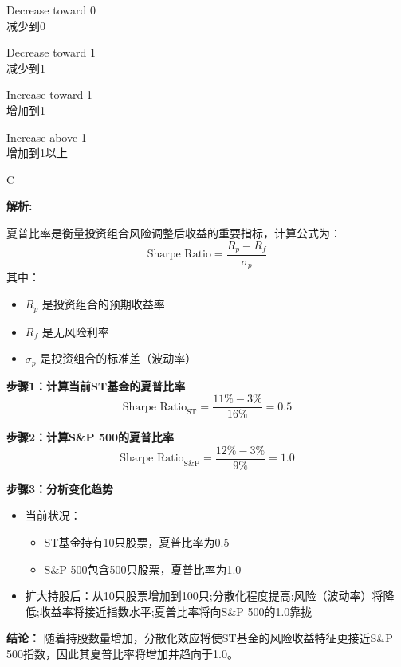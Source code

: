 \documentclass{article}
\newenvironment{explanation}
{\textbf{解析:}\par}
{\par}
\begin{document}
\begin{choices}
    \item Decrease toward 0
    \\
    减少到0
    \item Decrease toward 1
    \\
    减少到1
    \item Increase toward 1
    \\
    增加到1
    \item Increase above 1
    \\
    增加到1以上
\end{choices}

\begin{correctanswer}
    C
\end{correctanswer}

\begin{explanation}
    夏普比率是衡量投资组合风险调整后收益的重要指标，计算公式为：
    \[
    \text{Sharpe Ratio} = \frac{R_p - R_f}{\sigma_p}
    \]
    其中：
    \begin{itemize}
        \item $R_p$ 是投资组合的预期收益率
        \item $R_f$ 是无风险利率
        \item $\sigma_p$ 是投资组合的标准差（波动率）
    \end{itemize}


    \textbf{步骤1：计算当前ST基金的夏普比率}
    \[
    \text{Sharpe Ratio}_{\text{ST}} = \frac{11\% - 3\%}{16\%} = 0.5
    \]

    \textbf{步骤2：计算S\&P 500的夏普比率}
    \[
    \text{Sharpe Ratio}_{\text{S\&P}} = \frac{12\% - 3\%}{9\%} = 1.0
    \]

    \textbf{步骤3：分析变化趋势}
    \begin{itemize}
        \item 当前状况：
        \begin{itemize}
            \item ST基金持有10只股票，夏普比率为0.5
            \item S\&P 500包含500只股票，夏普比率为1.0
        \end{itemize}
        
        \item 扩大持股后：从10只股票增加到100只;分散化程度提高;风险（波动率）将降低;收益率将接近指数水平;夏普比率将向S\&P 500的1.0靠拢

    \end{itemize}

    \textbf{结论：} 随着持股数量增加，分散化效应将使ST基金的风险收益特征更接近S\&P 500指数，因此其夏普比率将增加并趋向于1.0。

\end{explanation}
\end{document}
